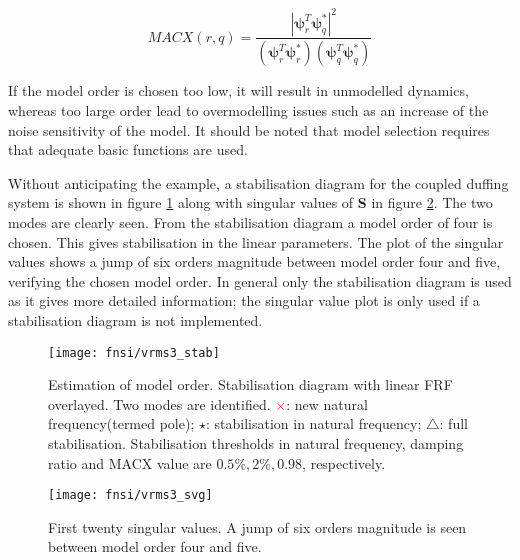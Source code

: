 \begin{equation}
  MACX(r,q) = \frac{|\bm \psi^T_r \bm \psi^*_q|^2}
  {\left( \bm \psi^T_r \bm \psi^*_r \right)\left( \bm \psi^T_q \bm \psi^*_q \right)}
\end{equation}



If the model order is chosen too low, it will result in unmodelled dynamics,
whereas too large order lead to overmodelling issues such as an increase of the
noise sensitivity of the model. It should be noted that model selection requires
that adequate basic functions are used.

Without anticipating the example, a stabilisation diagram for the coupled
duffing system is shown in figure \ref{fig:fnsi_stab} along with singular values
of $\bm S$ in figure \ref{fig:fnsi_svg}. The two modes are clearly seen.
From the stabilisation diagram a model order of four is chosen. This gives
stabilisation in the linear parameters. The plot of the singular values shows a
jump of six orders magnitude between model order four and five, verifying the
chosen model order.
In general only the stabilisation diagram is used as it gives more detailed
information; the singular value plot is only used if a stabilisation diagram is
not implemented.

\begin{figure}
  \centering
  \texttt{[image: fnsi/vrms3\_stab]}
  \caption{Estimation of model order. Stabilisation diagram with linear FRF
    overlayed. Two modes are identified.
    \textcolor{red}{$\pmb\times$}: new natural frequency(termed pole);
    $\pmb\star$: stabilisation in natural frequency;
    $\pmb\triangle$: full stabilisation.
    Stabilisation thresholds in natural frequency, damping ratio and MACX value
    are $0.5\%, 2\%, 0.98$, respectively.
  }
  \label{fig:fnsi_stab}
\end{figure}

\begin{figure}
  \centering
  \texttt{[image: fnsi/vrms3\_svg]}
  \caption{First twenty singular values. A jump of six orders magnitude is seen
    between model order four and five.}
  \label{fig:fnsi_svg}
\end{figure}

